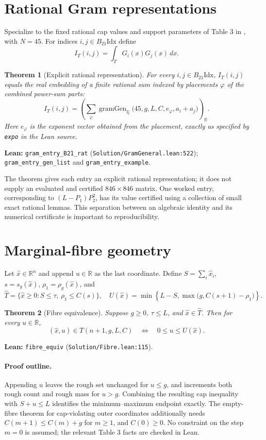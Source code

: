 \documentclass[11pt]{article}
\newtheorem{theorem}{Theorem}[section]
\newcommand{\Q}{\mathbb{Q}}
\newcommand{\R}{\mathbb{R}}
\newcommand{\IT}{I_T}
\newcommand{\gram}{\operatorname{gramGen}}
\newcommand{\code}[1]{\texttt{#1}}
\begin{document}
\section{Rational Gram representations}
Specialize to the fixed rational cap values and support parameters of Table 3 in
\cite{axiom}, with $N=45$. For indices $i,j\in B_{21}\mathrm{Idx}$ define
\[
 \IT(i,j)=\int_T G_i(x)G_j(x)\,dx.
\]
\begin{theorem}[Explicit rational representation]\label{thm:rational}
For every $i,j\in B_{21}\mathrm{Idx}$, $\IT(i,j)$ equals the real embedding of a
finite rational sum indexed by placements $\varphi$ of the combined power-sum parts:
\[
 \IT(i,j)=\left(\sum_{\varphi}
 \gram_{\Q}\bigl(45,g,L,C,e_{\varphi},a_i+a_j\bigr)\right)_{\R}.
\]
Here $e_{\varphi}$ is the exponent vector obtained from the placement, exactly as
specified by \code{expo} in the Lean source.
\end{theorem}
\noindent\textbf{Lean:} \code{gram\_entry\_B21\_rat}
(\nolinkurl{Solution/GramGeneral.lean:522});
\code{gram\_entry\_gen\_list} and \code{gram\_entry\_example}.

The theorem gives each entry an explicit rational representation; it does not
supply an evaluated and certified $846\times846$ matrix. One worked entry,
corresponding to $(L-P_1)P_2^2$, has its value certified using a collection of
small exact rational lemmas. This separation between an algebraic identity and
its numerical certificate is important to reproducibility.

\section{Marginal-fibre geometry}
Let $\widehat x\in\R^n$ and append $u\in\R$ as the last coordinate. Define
$S=\sum_i\widehat x_i$, $s=s_g(\widehat x)$,
$\rho_1=\rho_g(\widehat x)$, and
\[
 \widehat T=\{\widehat x\ge0:S\le\tau,\ \rho_1\le C(s)\},
 \quad U(\widehat x)=\min\!\left\{L-S,\max\bigl(g,C(s+1)-\rho_1\bigr)\right\}.
\]
\begin{theorem}[Fibre equivalence]\label{thm:fibre}
Suppose $g\ge0$, $\tau\le L$, and $\widehat x\in\widehat T$. Then for every
$u\in\R$,
\[
 (\widehat x,u)\in T(n+1,g,L,C)
 \quad\Longleftrightarrow\quad 0\le u\le U(\widehat x).
\]
\end{theorem}
\noindent\textbf{Lean:} \code{fibre\_equiv}
(\nolinkurl{Solution/Fibre.lean:115}).

\paragraph{Proof outline.}
Appending $u$ leaves the rough set unchanged for $u\le g$, and increments both
rough count and rough mass for $u>g$. Combining the resulting cap inequality with
$S+u\le L$ identifies the minimum--maximum endpoint exactly.
The empty-fibre theorem for cap-violating outer coordinates additionally needs
$C(m+1)\le C(m)+g$ for $m\ge1$, and $C(0)\ge0$. No constraint on the step
$m=0$ is assumed; the relevant Table 3 facts are checked in Lean.
\end{document}
